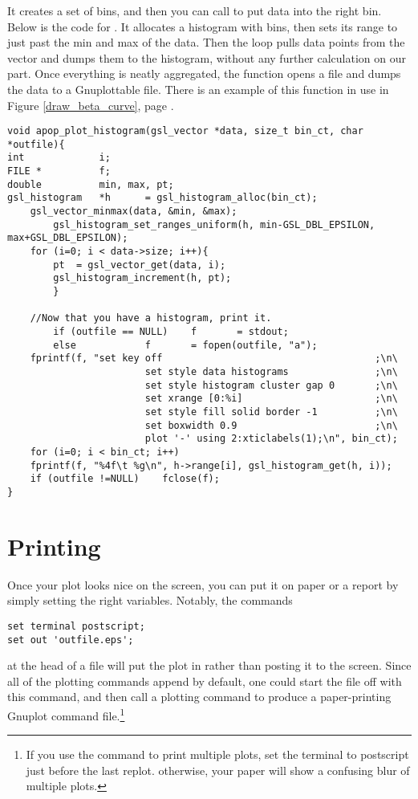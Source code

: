 It creates a set of bins, and
then you can call  to put
data into the right bin. Below is the code for . 
It allocates a histogram with
 bins, then sets its range to just past the min and max
of the data. Then the  loop pulls data points from the vector and
dumps them to the histogram, without any further calculation on our part.
Once everything is neatly aggregated, the function opens a file and dumps the data to a Gnuplottable file. There is an example of this function in use in Figure \ref{draw_beta_curve}, page \pageref{draw_beta_curve}.
\startonecol
\begin{lstlisting}
void apop_plot_histogram(gsl_vector *data, size_t bin_ct, char *outfile){
int             i;
FILE *          f;
double          min, max, pt;
gsl_histogram   *h      = gsl_histogram_alloc(bin_ct);
    gsl_vector_minmax(data, &min, &max);
        gsl_histogram_set_ranges_uniform(h, min-GSL_DBL_EPSILON, max+GSL_DBL_EPSILON);
    for (i=0; i < data->size; i++){
        pt  = gsl_vector_get(data, i);
        gsl_histogram_increment(h, pt);
        }

    //Now that you have a histogram, print it.
        if (outfile == NULL)    f       = stdout;
        else            f       = fopen(outfile, "a");
    fprintf(f, "set key off                                     ;\n\
                        set style data histograms               ;\n\
                        set style histogram cluster gap 0       ;\n\
                        set xrange [0:%i]                       ;\n\
                        set style fill solid border -1          ;\n\
                        set boxwidth 0.9                        ;\n\
                        plot '-' using 2:xticlabels(1);\n", bin_ct);
    for (i=0; i < bin_ct; i++)
    fprintf(f, "%4f\t %g\n", h->range[i], gsl_histogram_get(h, i));
    if (outfile !=NULL)    fclose(f);
}
\end{lstlisting}
\endonecol
\index{histograms!plotting|)}

\section{Printing}  
Once your plot looks nice on the screen, you can put it on paper or a
report by simply setting the right variables. Notably, the commands
\begin{lstlisting}
set terminal postscript;
set out 'outfile.eps';
\end{lstlisting}
at the head of a file will put the plot in \binline{outfile.eps} rather
than posting it to the screen. Since all of the plotting commands append
by default, one could start the file off with this command, and then
call a plotting command to produce a paper-printing Gnuplot command file.\footnote{If you use the  command to print multiple plots, set the terminal to postscript just before the last replot. otherwise, your paper will show a confusing blur of multiple plots.}

